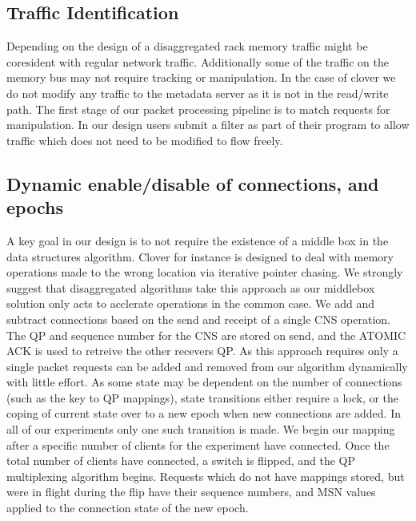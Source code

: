 
\subsection{Traffic Identification} Depending on the design of a disaggregated
rack memory traffic might be coresident with regular network traffic.
Additionally some of the traffic on the memory bus may not require tracking or
manipulation. In the case of clover we do not modify any traffic to the metadata
server as it is not in the read/write path. The first stage of our packet
processing pipeline is to match requests for manipulation. In our design users
submit a filter as part of their program to allow traffic which does not need to
be modified to flow freely.

\subsection{Dynamic enable/disable of connections, and epochs} A key goal in our
design is to not require the existence of a middle box in the data structures
algorithm. Clover for instance is designed to deal with memory operations made
to the wrong location via iterative pointer chasing. We strongly suggest that
disaggregated algorithms take this approach as our middlebox solution only acts
to acclerate operations in the common case. We add and subtract connections
based on the send and receipt of a single CNS operation. The QP and sequence
number for the CNS are stored on send, and the ATOMIC ACK is used to retreive
the other recevers QP. As this approach requires only a single packet requests
can be added and removed from our algorithm dynamically with little effort. As
some state may be dependent on the number of connections (such as the key to QP
mappings), state transitions either require a lock, or the coping of current
state over to a new epoch when new connections are added. In all of our
experiments only one such transition is made. We begin our mapping after a
specific number of clients for the experiment have connected. Once the total
number of clients have connected, a switch is flipped, and the QP multiplexing
algorithm begins. Requests which do not have mappings stored, but were in flight
during the flip have their sequence numbers, and MSN values applied to the
connection state of the new epoch.

